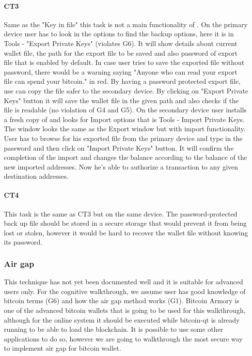 \paragraph{CT3} Same as the "Key in file" this task is not a main functionality of \multibit. On the primary device user has to look in the options to find the backup options, here it is in Tools - "Export Private Keys" (violates G6). It will show details about current wallet file, the path for the export file to be saved and also password of export file that is enabled by default. In case user tries to save the exported file without password, there would be a warning saying "Anyone who can read your export file can spend your bitcoin." in red. By having a password protected export file, use can copy the file safer to the secondary device. By clicking on "Export Private Keys" button it will save the wallet file in the given path and also checks if the file is readable (no violation of G4 and G5). On the secondary device user installs a fresh copy of \multibit and looks for Import options that is Tools - Import Private Keys. The window looks the same as the Export window but with import functionality. User has to browse for his exported file from the primary device and type in the password and then click on "Import Private Keys" button. It will confirm the completion of the import and changes the balance according to the balance of the new imported addresses. Now he's able to authorize a transaction to any given destination addresses.


\paragraph{CT4} This task is the same as CT3 but on the same device. The password-protected back up file should be stored in a secure storage that would prevent it from being lost or stolen, however it would be hard to recover the wallet file without knowing its password. 



\subsubsection{Air gap}
\label{air gap}
This technique has not yet been documented well and it is suitable for advanced users only. For the cognitive walkthrough, we assume user has good knowledge of bitcoin terms (G6) and how the air gap method works (G1). Bitcoin Armory is one of the advanced bitcoin wallets that is going to be used for this walkthrough, although for the online system it should be executed while bitcoin-qt is already running to be able to load the blockchain. It is possible to use some other applications to do so, however we are going to walkthrough the most secure way to implement air gap for bitcoin wallet.

